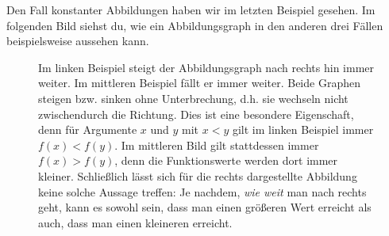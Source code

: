 \documentclass[../../main.tex]{subfiles}
\begin{document}
Den Fall konstanter Abbildungen haben wir im letzten Beispiel gesehen. Im folgenden Bild siehst du, wie ein Abbildungsgraph in den anderen drei Fällen beispielsweise aussehen kann.

\begin{figure}[ht]
    \centering
    \begin{multicols}{3}\centering
    \end{multicols}
    \caption{Im linken Beispiel steigt der Abbildungsgraph nach rechts hin immer weiter. Im mittleren Beispiel fällt er immer weiter. Beide Graphen steigen bzw. sinken ohne Unterbrechung, d.h. sie wechseln nicht zwischendurch die Richtung. Dies ist eine besondere Eigenschaft, denn für Argumente $x$ und $y$ mit $x<y$ gilt im linken Beispiel immer $f(x)<f(y)$. Im mittleren Bild gilt stattdessen immer $f(x)>f(y)$, denn die Funktionswerte werden dort immer kleiner.
    Schließlich lässt sich für die rechts dargestellte Abbildung keine solche Aussage treffen: Je nachdem, \emph{wie weit} man nach rechts geht, kann es sowohl sein, dass man einen größeren Wert erreicht als auch, dass man einen kleineren erreicht.}
\end{figure}
\end{document}
